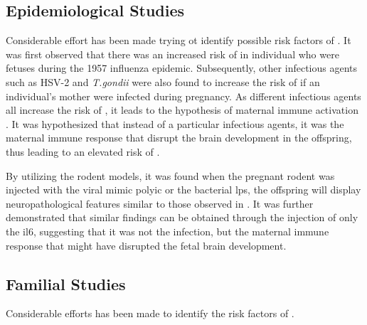 \documentclass{book}
\newcommand*{\glng}{\glsentrylong}
\begin{document}
	\subsection{Epidemiological Studies}
	Considerable effort has been made trying ot identify possible risk factors of \glng{scz}. 
	It was first observed that there was an increased risk of \glng{scz} in individual who were fetuses during the 1957 influenza epidemic\citep{Mednick1958}. 
	Subsequently, other infectious agents such as HSV-2 and \textit{T.gondii} were also found to increase the risk of \glng{scz} if an individual's mother were infected during pregnancy.
	As different infectious agents all increase the risk of \glng{scz}, it leads to the hypothesis of maternal immune activation \citep{Brown2010}.
	It was hypothesized that instead of a particular infectious agents, it was the maternal immune response that disrupt the brain development in the offspring, thus leading to an elevated risk of \glng{scz}.
	
	By utilizing the rodent models, it was found when the pregnant rodent was injected with the viral mimic \gls{polyic} or the bacterial \gls{lps}, the offspring will display neuropathological features similar to those observed in \glng{scz}\citep{Meyer2009b}.
	It was further demonstrated that similar findings can be obtained through the injection of only the \gls{il6}, suggesting that it was not the infection, but the maternal immune response that might have disrupted the fetal brain development.
	
	
	
	\subsection{Familial Studies}
	
	Considerable efforts has been made to identify the risk factors of \glng{scz}.
	
\end{document}
